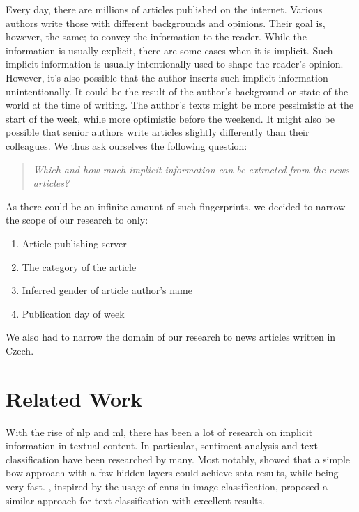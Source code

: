 Every day, there are millions of articles published on the internet. Various authors write those
with different backgrounds and opinions. Their goal is, however, the same; to convey the information to the reader.
While the information is usually explicit, there are some cases when it is implicit. Such implicit information 
is usually intentionally used to shape the reader's opinion. However, it's also possible
that the author inserts such implicit information unintentionally. It could
be the result of the author's background or state of the world at the time of writing.
The author's texts might be more pessimistic at the start of the week, while more optimistic before the weekend.
It might also be possible that senior authors write articles slightly differently than their colleagues.
We thus ask ourselves the following question:
\begin{quote}
    \textit{Which and how much implicit information can be extracted from the news articles?}
\end{quote}

As there could be an infinite amount of such fingerprints, we decided to narrow the scope of our research to only:
\begin{enumerate}
    \item Article publishing server
    \item The category of the article
    \item Inferred gender of article author's name
    \item Publication day of week
\end{enumerate}
We also had to narrow the domain of our research to news articles written in Czech.



\section*{Related Work}
With the rise of \ac{nlp} and \ac{ml},
there has been a lot of research on implicit information in textual content.
In particular, sentiment analysis and text classification have been researched by many.
Most notably, \textcite{joulinBagTricksEfficient2016} showed that a simple \acl{bow} approach
with a few hidden layers could achieve \ac{sota} results, while being very fast.
\textcite{zhangTextUnderstandingScratch2016}, inspired by the usage of \acp{cnn} in image classification,
proposed a similar approach for text classification with excellent results.

